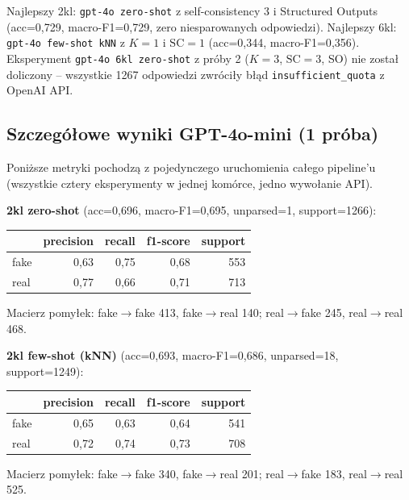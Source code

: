 \documentclass[11pt,a4paper]{article}
\begin{document}
Najlepszy 2kl: \texttt{gpt-4o zero-shot} z self-consistency 3 i
Structured Outputs (acc=0{,}729, macro-F1=0{,}729, zero niesparowanych
odpowiedzi). Najlepszy 6kl: \texttt{gpt-4o few-shot kNN} z $K=1$
i $\text{SC}=1$ (acc=0{,}344, macro-F1=0{,}356). Eksperyment
\texttt{gpt-4o 6kl zero-shot} z próby 2 ($K=3$, $\text{SC}=3$, SO)
nie został doliczony -- wszystkie 1267 odpowiedzi zwróciły błąd
\texttt{insufficient\_quota} z OpenAI API.

\subsection{Szczegółowe wyniki GPT-4o-mini (1 próba)}

Poniższe metryki pochodzą z pojedynczego uruchomienia całego pipeline'u
(wszystkie cztery eksperymenty w jednej komórce, jedno wywołanie API).

\textbf{2kl zero-shot} (acc=0{,}696, macro-F1=0{,}695, unparsed=1, support=1266):
\begin{center}
\begin{tabular}{lrrrr}
\toprule
 & precision & recall & f1-score & support \\
\midrule
fake & 0{,}63 & 0{,}75 & 0{,}68 & 553 \\
real & 0{,}77 & 0{,}66 & 0{,}71 & 713 \\
\bottomrule
\end{tabular}
\end{center}
Macierz pomyłek: fake$\to$fake 413, fake$\to$real 140; real$\to$fake 245,
real$\to$real 468.

\textbf{2kl few-shot (kNN)} (acc=0{,}693, macro-F1=0{,}686, unparsed=18, support=1249):
\begin{center}
\begin{tabular}{lrrrr}
\toprule
 & precision & recall & f1-score & support \\
\midrule
fake & 0{,}65 & 0{,}63 & 0{,}64 & 541 \\
real & 0{,}72 & 0{,}74 & 0{,}73 & 708 \\
\bottomrule
\end{tabular}
\end{center}
Macierz pomyłek: fake$\to$fake 340, fake$\to$real 201; real$\to$fake 183,
real$\to$real 525.
\end{document}
